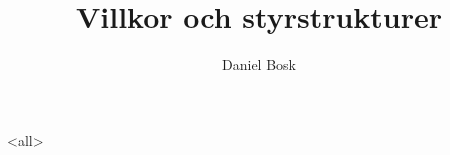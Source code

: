 \documentclass[ignoreframetext]{beamer}
\begin{document}
\title{%
  Villkor och styrstrukturer
}
\author{Daniel Bosk}

\begin{frame}
  \maketitle
\end{frame}

\mode<all>

\mode*
\end{document}
